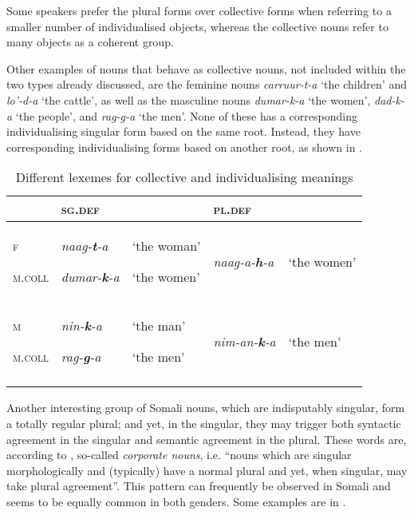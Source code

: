 \documentclass[output=paper]{langsci/langscibook}
\begin{document}
Some speakers prefer the plural forms over collective forms when referring to a smaller number of individualised objects, whereas the collective nouns refer to many objects as a coherent group. 

Other examples of nouns that behave as collective nouns, not included within the two types already discussed, are the feminine nouns \textit{carruur-t-a} ‘the children’ and \textit{lo’-d-a} ‘the cattle’, as well as the masculine nouns \textit{dumar-k-a} ‘the women’, \textit{dad-k-a} ‘the people’, and \textit{rag-g-a} ‘the men’. None of these has a corresponding individualising singular form based on the same root. Instead, they have corresponding individualising forms based on another root, as shown in .


\begin{table}
\caption{Different lexemes for collective and individualising meanings}
\label{tab:13}
\begin{tabularx}{\textwidth}{XXXXX} 
\lsptoprule
& {\textsc{sg.def}} &  & {\textsc{pl.def}} & \\
\midrule
{\textsc{f}}

{\textsc{m.coll}} & {\textit{naag-}\textbf{\textit{t}}\textit{-a}}

{\textit{dumar-}\textbf{\textit{k}}\textit{-a}} & {‘the woman’}

{‘the women’} & {\textit{naag-a-}\textbf{\textit{h}}\textit{-a}} & {‘the women’}\\
{\textsc{m}}

{\textsc{m.coll}} & {\textit{nin-}\textbf{\textit{k}}\textit{-a}}

{\textit{rag-}\textbf{\textit{g}}\textit{-a}} & {‘the man’}

{‘the men’} & {\textit{nim-an-}\textbf{\textit{k}}\textit{-a}} & {‘the men’}\\
\lspbottomrule
\end{tabularx}

\end{table} 



Another interesting group of Somali nouns, which are indisputably singular, form a totally regular plural; and yet, in the singular, they may trigger both syntactic agreement in the singular and semantic agreement in the plural. These words are, according to \citet[188]{Corbett2000}, so-called \textit{corporate nouns}, i.e. “nouns which are singular morphologically and (typically) have a normal plural and yet, when singular, may take plural agreement”. This pattern can frequently be observed in Somali and seems to be equally common in both genders. Some examples are in .
 
\end{document}
